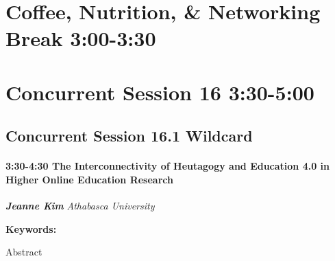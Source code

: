 \documentclass[
]{book}
\begin{document}
\hypertarget{coffee-nutrition-networking-break-300-330-3}{%
\section*{Coffee, Nutrition, \& Networking Break \textbar{} 3:00-3:30}\label{coffee-nutrition-networking-break-300-330-3}}

\hypertarget{concurrent-session-16-330-500}{%
\section*{Concurrent Session 16 \textbar{} 3:30-5:00}\label{concurrent-session-16-330-500}}

\hypertarget{concurrent-session-16.1-wildcard}{%
\subsection*{Concurrent Session 16.1 \textbar{} Wildcard}\label{concurrent-session-16.1-wildcard}}

\begin{session}
\hypertarget{the-interconnectivity-of-heutagogy-and-education-4.0-in-higher-online-education-research}{%
\paragraph*{\texorpdfstring{3:30-4:30 \textbar{} \textbf{The
Interconnectivity of Heutagogy and Education 4.0 in Higher Online
Education} \textbar{}
Research}{3:30-4:30 \textbar{} The Interconnectivity of Heutagogy and Education 4.0 in Higher Online Education \textbar{} Research}}\label{the-interconnectivity-of-heutagogy-and-education-4.0-in-higher-online-education-research}}

\textbf{\emph{Jeanne Kim}} \textbar{} \emph{Athabasca University}

\textbf{Keywords:}

Abstract
\end{session}
\end{document}
